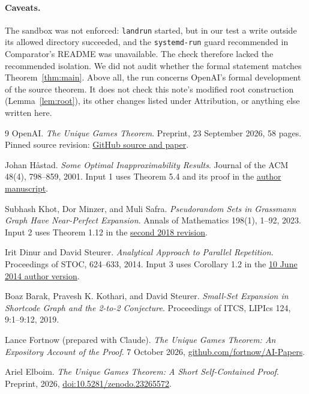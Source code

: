 \documentclass[11pt]{article}
\begin{document}
\paragraph{Caveats.} The sandbox was not enforced: \texttt{landrun}
started, but in our test a write outside its allowed directory succeeded,
and the \texttt{systemd-run} guard recommended in Comparator's README was
unavailable. The check therefore lacked the recommended isolation. We did
not audit whether the formal statement matches Theorem~\ref{thm:main}.
Above all, the run concerns OpenAI's formal development of the source
theorem. It does not check this note's modified root construction
(Lemma~\ref{lem:root}), its other changes listed under Attribution, or
anything else written here.

\footnotesize
\begin{thebibliography}{9}
\setlength{\itemsep}{1pt}
OpenAI. \emph{The Unique Games Theorem}. Preprint, 23 September 2026,
58 pages. Pinned source revision:
\href{https://github.com/openai/math/tree/fd4aeeb2ee4fc729c18d98444fed42fd0529eeeb/preprints/The-Unique-Games-Theorem-September-23-2026}{GitHub source and paper}.

Johan H\aa stad. \emph{Some Optimal Inapproximability Results}.
Journal of the ACM 48(4), 798--859, 2001.
Input 1 uses Theorem 5.4 and its proof in the
\href{https://people.kth.se/~johanh/optimalinap.pdf}{author manuscript}.

Subhash Khot, Dor Minzer, and Muli Safra.
\emph{Pseudorandom Sets in Grassmann Graph Have Near-Perfect Expansion}.
Annals of Mathematics 198(1), 1--92, 2023.
Input 2 uses Theorem 1.12 in the
\href{https://eccc.weizmann.ac.il/report/2018/006/revision/2/download}{second 2018 revision}.

Irit Dinur and David Steurer. \emph{Analytical Approach to Parallel
Repetition}. Proceedings of STOC, 624--633, 2014.
Input 3 uses Corollary 1.2 in the
\href{https://www.dsteurer.org/paper/productgames.pdf}{10 June 2014 author version}.

Boaz Barak, Pravesh K. Kothari, and David Steurer.
\emph{Small-Set Expansion in Shortcode Graph and the 2-to-2 Conjecture}.
Proceedings of ITCS, LIPIcs 124, 9:1--9:12, 2019.

Lance Fortnow (prepared with Claude). \emph{The Unique Games Theorem: An
Expository Account of the Proof}. 7 October 2026,
\href{https://github.com/fortnow/AI-Papers}{github.com/fortnow/AI-Papers}.
\raggedright
{}
Ariel Elboim. \emph{The Unique Games Theorem: A Short Self-Contained
Proof}. Preprint, 2026,
\href{https://doi.org/10.5281/zenodo.23265572}{doi:10.5281/zenodo.23265572}.
\end{thebibliography}
\end{document}
